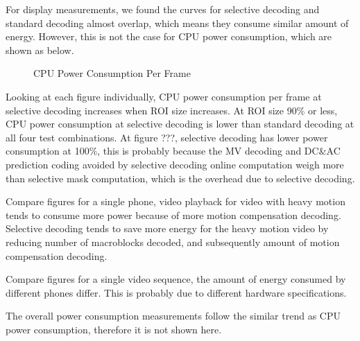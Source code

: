 For display measurements, we found the curves for selective decoding and standard decoding almost overlap, which means they consume similar amount of energy. However, this is not the case for CPU power consumption, which are shown as below. 
\begin{figure}
\centering
\caption{CPU Power Consumption Per Frame}
\end{figure}
Looking at each figure individually, CPU power consumption per frame at selective decoding increases when ROI size increases. At ROI size 90\% or less, CPU power consumption at selective decoding is lower than standard decoding at all four test combinations. At figure ???, selective decoding has lower power consumption at 100\%, this is probably because the MV decoding and DC\&AC prediction coding avoided by selective decoding online computation weigh more than selective mask computation, which is the overhead due to selective decoding.

Compare figures for a single phone, video playback for video with heavy motion tends to consume more power because of more motion compensation decoding. Selective decoding tends to save more energy for the heavy motion video by reducing number of macroblocks decoded, and subsequently amount of motion compensation decoding. 

Compare figures for a single video sequence, the amount of energy consumed by different phones differ. This is probably due to different hardware specifications. 

The overall power consumption measurements follow the similar trend as CPU power consumption, therefore it is not shown here. 


